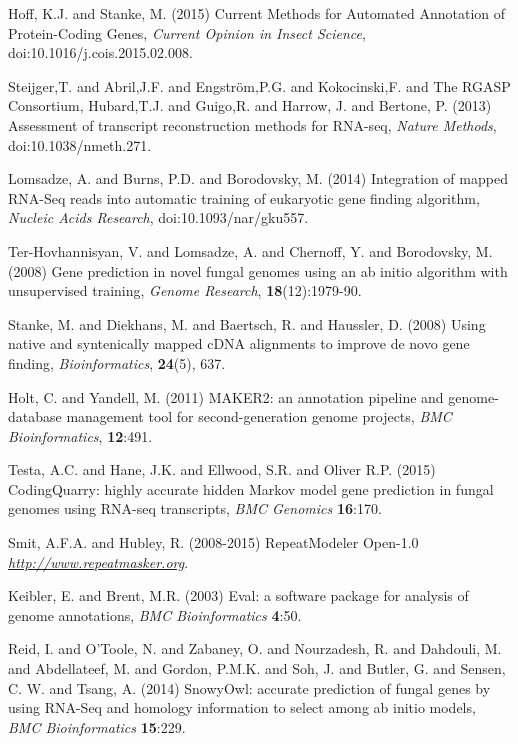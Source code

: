 \documentclass[a4paper,10pt]{article}
\begin{document}
\begin{thebibliography}{}
Hoff, K.J. and Stanke, M. (2015) Current Methods for Automated Annotation of Protein-Coding Genes, {\it Current Opinion in Insect Science}, doi:10.1016/j.cois.2015.02.008.

 Steijger,T. and Abril,J.F. and Engstr\"{o}m,P.G. and Kokocinski,F. and The RGASP Consortium, Hubard,T.J. and Guigo,R. and Harrow, J. and Bertone, P. (2013) Assessment of transcript reconstruction methods for
 RNA-seq, {\it Nature Methods}, doi:10.1038/nmeth.271.

 Lomsadze, A. and Burns, P.D. and Borodovsky, M. (2014) Integration of mapped RNA-Seq reads into automatic training of eukaryotic gene finding algorithm, {\it Nucleic Acids Research}, doi:10.1093/nar/gku557.

 Ter-Hovhannisyan, V. and Lomsadze, A. and Chernoff, Y. and Borodovsky, M. (2008) Gene prediction in novel fungal genomes using an ab initio algorithm with unsupervised training, \textit{Genome Research}, \textbf{18}(12):1979-90.

Stanke, M. and Diekhans, M. and Baertsch, R. and Haussler, D. (2008) Using native and syntenically mapped cDNA alignments to improve de novo gene finding, \textit{Bioinformatics}, \textbf{24}(5), 637.

 Holt, C. and Yandell, M. (2011) MAKER2: an annotation pipeline and genome-database management tool for second-generation genome projects, \textit{BMC Bioinformatics}, \textbf{12}:491.

 Testa, A.C. and Hane, J.K. and Ellwood, S.R. and Oliver R.P. (2015) CodingQuarry: highly accurate hidden Markov model gene prediction in fungal genomes using RNA-seq transcripts, \textit{BMC Genomics} \textbf{16}:170.

 Smit, A.F.A. and Hubley, R. (2008-2015) RepeatModeler Open-1.0 \textit{\url{http://www.repeatmasker.org}}.

 Keibler, E. and Brent, M.R. (2003) Eval: a software package for analysis of genome annotations, \textit{BMC Bioinformatics} \textbf{4}:50.

Reid, I. and O'Toole, N. and Zabaney, O. and Nourzadesh, R. and Dahdouli, M. and Abdellateef, M. and Gordon, P.M.K. and Soh, J. and Butler, G. and Sensen, C. W. and Tsang, A. (2014) SnowyOwl: accurate prediction of fungal genes by using RNA-Seq and homology information to select among ab initio models, \textit{BMC Bioinformatics} \textbf{15}:229.


\end{thebibliography}
\end{document}
